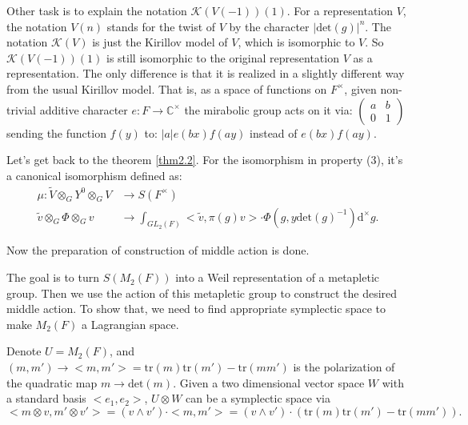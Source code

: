 \documentclass[12pt,a4paper,english]{article}
\theoremstyle{plain}
\theoremstyle{definition}
\begin{document}
Other task is to explain the notation $\mathcal{K}(V(-1))(1)$.  For a representation $V$, the notation $V(n)$ stands for the twist of $V$ by the character $|\text{det}(g)|^n$.
The notation $\mathcal{K}(V)$ is just the Kirillov model of $V$, which is isomorphic to $V$.
So $\mathcal{K}(V(-1))(1)$ is still isomorphic to the original representation $V$ as a representation. The only difference is that it is realized in a slightly different way from the usual Kirillov model. That is, as a space of functions on $F^\times$, given non-trivial additive character $e:F\rightarrow  \mathbb{C}^{\times}$ the mirabolic group acts on it via:
$\begin{pmatrix} 
a & b \\ 
0 & 1 
\end{pmatrix}$
sending the function $f(y)$ to:
$|a| e(bx) f(ay)$
instead of $e(bx) f(ay)$.


Let's get back to the theorem \ref{thm2.2}. For the isomorphism in property (3), it's a canonical isomorphism defined as:
\begin{align*}
    \mu: \widetilde{V}\otimes_{G}Y^{0}\otimes_{G}V&\rightarrow S(F^{\times})\\
    \widetilde{v}\otimes_{G}\Phi\otimes_{G}v&\rightarrow \int_{GL_{2}(F)}<\widetilde{v},\pi(g)v>\cdot \Phi(g,y\text{det}(g)^{-1})\text{d}^{\times}g.
\end{align*}

Now the preparation of construction of middle action is done. 



The goal is to turn $S(M_{2}(F))$ into a Weil representation of a metapletic group. Then we use the action of this metapletic group to construct the desired middle action.  To show that, we need to find appropriate symplectic space to make $M_{2}(F)$ a Lagrangian space. 

Denote $U=M_{2}(F)$, and $
    (m, m')\rightarrow <m ,m'>=\text{tr}(m)\text{tr}(m')-\text{tr}(mm')$
is the polarization of the quadratic map $m\rightarrow \text{det}(m)$. Given a two dimensional vector space $W$ with a standard basis $<e_{1},e_{2}>$, $U\otimes W$ can be a symplectic space via 
\begin{equation*}
    <m\otimes v, m'\otimes v'>=(v\wedge v')\cdot <m, m'>=(v\wedge v')\cdot (\text{tr}(m)\text{tr}(m')-\text{tr}(mm')).
\end{equation*}
 
\end{document}
